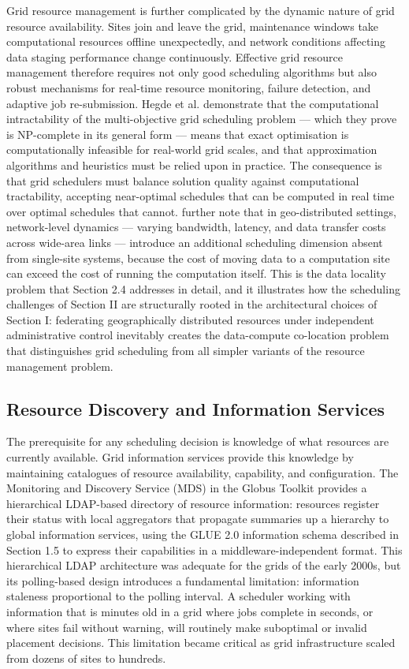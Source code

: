\documentclass[12pt,a4paper]{report}
\begin{document}
Grid resource management is further complicated by the dynamic nature of grid resource availability. Sites join and leave the grid, 
maintenance windows take computational resources offline unexpectedly, and network conditions affecting data staging performance change continuously.
 Effective grid resource management therefore requires not only good scheduling algorithms but also robust mechanisms for real-time resource monitoring,
  failure detection, and adaptive job re-submission. Hegde et al. \parencite{hegde2024} demonstrate that the computational intractability of the multi-objective grid 
  scheduling problem — which they prove is NP-complete in its general form — means that exact optimisation is computationally infeasible for real-world
   grid scales, and that approximation algorithms and heuristics must be relied upon in practice. The consequence is that grid schedulers must balance 
   solution quality against computational tractability, accepting near-optimal schedules that can be computed in real time over optimal schedules that
    cannot. \parencite{wu2025task} further note that in geo-distributed settings, network-level dynamics — varying bandwidth, latency, and data transfer 
    costs across wide-area links — introduce an additional scheduling dimension absent from single-site systems, because the cost of moving data to 
    a computation site can exceed the cost of running the computation itself. This is the data locality problem that Section 2.4 addresses in detail, 
    and it illustrates how the scheduling challenges of Section II are structurally rooted in the architectural choices of Section I: federating 
    geographically distributed resources under independent administrative control inevitably creates the data-compute co-location problem that 
    distinguishes grid scheduling from all simpler variants of the resource management problem.

\subsection{Resource Discovery and Information Services}
The prerequisite for any scheduling decision is knowledge of what resources are currently available. Grid information services provide this
 knowledge by maintaining catalogues of resource availability, capability, and configuration. The Monitoring and Discovery Service (MDS) in 
 the Globus Toolkit provides a hierarchical LDAP-based directory of resource information: resources register their status with local aggregators
  that propagate summaries up a hierarchy to global information services, using the GLUE 2.0 information schema described in Section 1.5 to express 
  their capabilities in a middleware-independent format. This hierarchical LDAP architecture was adequate for the grids of the early 2000s, but
   its polling-based design introduces a fundamental limitation: information staleness proportional to the polling interval. A scheduler working 
   with information that is minutes old in a grid where jobs complete in seconds, or where sites fail without warning, will routinely make suboptimal 
   or invalid placement decisions. This limitation became critical as grid infrastructure scaled from dozens of sites to hundreds.
      
\end{document}
